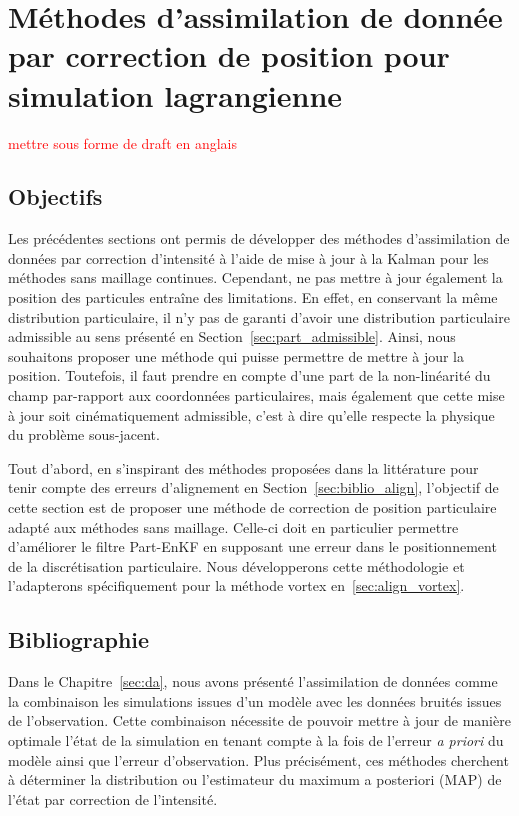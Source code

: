 
\chapter{Méthodes d'assimilation de donnée par correction de position pour simulation lagrangienne}

\textcolor{red}{mettre sous forme de draft en anglais}
\section{Objectifs}

Les précédentes sections ont permis de développer des méthodes d'assimilation de données par correction d'intensité à l'aide de mise à jour à la Kalman pour les méthodes sans maillage continues. Cependant, ne pas mettre à jour également la position des particules entraîne des limitations. En effet, en conservant la même distribution particulaire, il n'y pas de garanti d'avoir une distribution particulaire admissible au sens présenté en Section~\ref{sec:part_admissible}.
Ainsi, nous souhaitons proposer une méthode qui puisse permettre de mettre à jour la position. Toutefois, il faut prendre en compte d'une part de la non-linéarité du champ par-rapport aux coordonnées particulaires, mais également que cette mise à jour soit cinématiquement admissible, c'est à dire qu'elle respecte la physique du problème sous-jacent.

Tout d'abord, en s'inspirant des méthodes proposées dans la littérature pour tenir compte des erreurs d'alignement en Section~\ref{sec:biblio_align}, l'objectif de cette section est de proposer une méthode de correction de position particulaire adapté aux méthodes sans maillage. Celle-ci doit en particulier permettre d'améliorer le filtre Part-EnKF en supposant une erreur dans le positionnement de la discrétisation particulaire. Nous développerons cette méthodologie et l'adapterons spécifiquement pour la méthode vortex en~\ref{sec:align_vortex}.

\section{Bibliographie}

Dans le Chapitre~\ref{sec:da}, nous avons présenté l'assimilation de données comme la combinaison les simulations issues d'un modèle avec les données bruités issues de l'observation. Cette combinaison nécessite de pouvoir mettre à jour de manière optimale l'état de la simulation en tenant compte à la fois de l'erreur \textit{a priori} du modèle ainsi que l'erreur d'observation. Plus précisément, ces méthodes cherchent à déterminer la distribution ou l'estimateur du maximum a posteriori (MAP) de l'état par correction de l'intensité.

